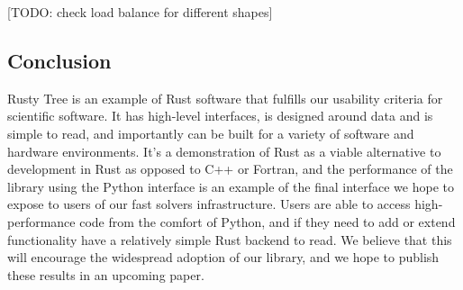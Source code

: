 [TODO: check load balance for different shapes]

\subsection*{Conclusion}

Rusty Tree is an example of Rust software that fulfills our usability criteria for scientific software. It has high-level interfaces, is designed around data and is simple to read, and importantly can be built for a variety of software and hardware environments. It's a demonstration of Rust as a viable alternative to development in Rust as opposed to C++ or Fortran, and the performance of the library using the Python interface is an example of the final interface we hope to expose to users of our fast solvers infrastructure. Users are able to access high-performance code from the comfort of Python, and if they need to add or extend functionality have a relatively simple Rust backend to read. We believe that this will encourage the widespread adoption of our library, and we hope to publish these results in an upcoming paper.
